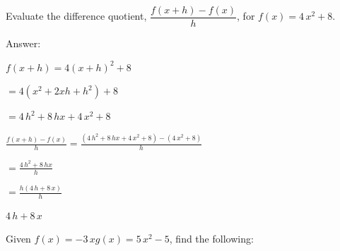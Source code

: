 \documentclass[11pt]{exam}
\begin{document}
\begin{questions}
\begin{parts}
\end{parts}
\label{exact-endoca}
\newpage

\headerbox{\ocb}
\label{exact-startocb}
\question[4]
Evaluate the difference quotient, \(\dfrac{f(x+h)-f(x)}{h}\), for \(\displaystyle{ f(x) = 4 \, x^{2} + 8 }\).\\\vspace{12pt}

Answer: \fillin[][2in]
\begin{solution}
\(f(x+h) = 4(x+h)^2 + 8\) 

 \(= 4(x^2 + 2xh + h^2) + 8\) 

 \(= 4 \, h^{2} + 8 \, h x + 4 \, x^{2} + 8\) 

 \(\displaystyle{\frac{f(x+h)-f(x)}{h} = \frac{ (4 \, h^{2} + 8 \, h x + 4 \, x^{2} + 8) - (4 \, x^{2} + 8) }{h}}\) 

 \(=\displaystyle{ \frac{ 4 \, h^{2} + 8 \, h x }{h}}\) 

 \(= \displaystyle{ \frac{ h(4 \, h + 8 \, x) }{h}}\) 

 \(\boxed{ 4 \, h + 8 \, x }\)
\end{solution}
\newpage

\question
Given \(\displaystyle{ f(x) = -3 \, x }\)\(\displaystyle{ g(x) = 5 \, x^{2} - 5 }\), find the following:\\
\end{questions}
\end{document}
